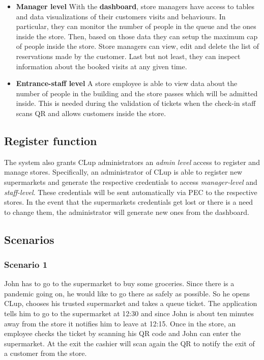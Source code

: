 \begin{itemize}
	\item \textbf{Manager level}\newline
	With the \textbf{dashboard}, store managers have access to tables and data visualizations of their customers visits and behaviours. In particular, they can monitor the number of people in the queue and the ones inside the store. Then, based on those data they can setup the maximum cap of people inside the store.\newline
	Store managers can view, edit and delete the list of reservations made by the customer.\newline
	Last but not least, they can inspect information about the booked visits at any given time.

	\item \textbf{Entrance-staff level}\newline
	A store employee is able to view data about the number of people in the building and the store passes which will be admitted inside.
	This is needed during the validation of tickets when the check-in staff scans QR and allows customers inside the store.
\end{itemize}

\subsection{Register function}
The system also grants CLup administrators an \textit{admin level} access to register and manage stores.
Specifically, an administrator of CLup is able to register new supermarkets and generate the respective credentials to access \textit{manager-level} and \textit{staff-level}. These credentials will be sent automatically via PEC to the respective stores.\newline
In the event that the supermarkets credentials get lost or there is a need to change them, the administrator will generate new ones from the dashboard.

\clearpage

\subsection{Scenarios}

\subsubsection{Scenario 1}\label{sc:first}
John has to go to the supermarket to buy some groceries. Since there is a pandemic going on, he would like to go there as safely as possible.\newline
So he opens CLup, chooses his trusted supermarket and takes a queue ticket. The application tells him to go to the supermarket at 12:30 and since John is about ten minutes away from the store it notifies him to leave at 12:15. Once in the store, an employee checks the ticket by scanning his QR code and John can enter the supermarket.
At the exit the cashier will scan again the QR to notify the exit of a customer from the store.

